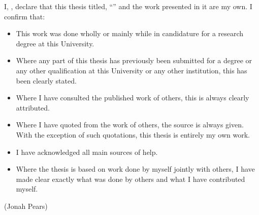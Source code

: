 

\begin{declaration}
  \addchaptertocentry{\authorshipname} %
  \noindent I, \authorname, declare that this thesis titled, \enquote{\ttitle} and the work presented in it are my own. I confirm that:

  \begin{itemize}
    \item This work was done wholly or mainly while in candidature for a research degree at this University.
    \item Where any part of this thesis has previously been submitted for a degree or any other qualification at this University or any other institution, this has been clearly stated.
    \item Where I have consulted the published work of others, this is always clearly attributed.
    \item Where I have quoted from the work of others, the source is always given. With the exception of such quotations, this thesis is entirely my own work.
    \item I have acknowledged all main sources of help.
    \item Where the thesis is based on work done by myself jointly with others, I have made clear exactly what was done by others and what I have contributed myself.\\
  \end{itemize}


  \hfill \rule{0pt}{2cm} {(Jonah Pears)}


  \rule{0pt}{15em}%

\end{declaration}

\cleardoublepage




